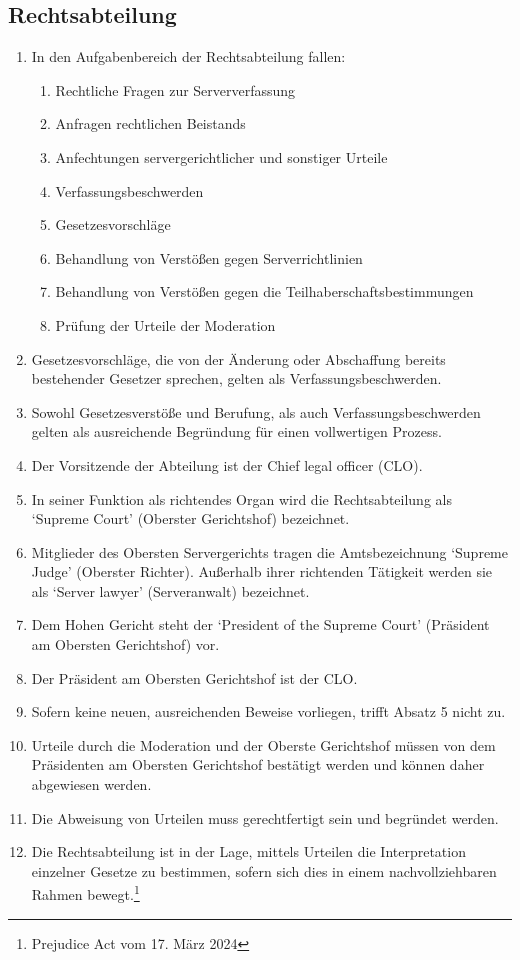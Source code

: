 \documentclass{article}
\begin{document}
\subsection{Rechtsabteilung}
\begin{enumerate}[(1)]
	\item In den Aufgabenbereich der Rechtsabteilung fallen:
	\begin{enumerate}[1.]
		\item Rechtliche Fragen zur Serververfassung
		\item Anfragen rechtlichen Beistands
		\item Anfechtungen servergerichtlicher und sonstiger Urteile
		\item Verfassungsbeschwerden
		\item Gesetzesvorschläge
		\item Behandlung von Verstößen gegen Serverrichtlinien
		\item Behandlung von Verstößen gegen die Teilhaberschaftsbestimmungen
		\item Prüfung der Urteile der Moderation
	\end{enumerate}
	\item Gesetzesvorschläge, die von der Änderung oder Abschaffung bereits bestehender Gesetzer sprechen, gelten als Verfassungsbeschwerden.
	\item Sowohl Gesetzesverstöße und Berufung, als auch Verfassungsbeschwerden gelten als ausreichende Begründung für einen vollwertigen Prozess.
	\item Der Vorsitzende der Abteilung ist der Chief legal officer (CLO).
	\item In seiner Funktion als richtendes Organ wird die Rechtsabteilung als `Supreme Court' (Oberster Gerichtshof) bezeichnet.
	\item Mitglieder des Obersten Servergerichts tragen die Amtsbezeichnung `Supreme Judge' (Oberster Richter). Außerhalb ihrer richtenden Tätigkeit werden sie als `Server lawyer' (Serveranwalt) bezeichnet.
	\item Dem Hohen Gericht steht der `President of the Supreme Court' (Präsident am Obersten Gerichtshof) vor.
	\item Der Präsident am Obersten Gerichtshof ist der CLO.\@
	\item Sofern keine neuen, ausreichenden Beweise vorliegen, trifft Absatz 5 nicht zu.
	\item Urteile durch die Moderation und der Oberste Gerichtshof müssen von dem Präsidenten am Obersten Gerichtshof bestätigt werden und können daher abgewiesen werden.
	\item Die Abweisung von Urteilen muss gerechtfertigt sein und begründet werden.
	\item Die Rechtsabteilung ist in der Lage, mittels Urteilen die Interpretation einzelner Gesetze zu bestimmen, sofern sich dies in einem nachvollziehbaren Rahmen bewegt.\footnote{Prejudice Act vom 17. März 2024}
\end{enumerate}
\end{document}
